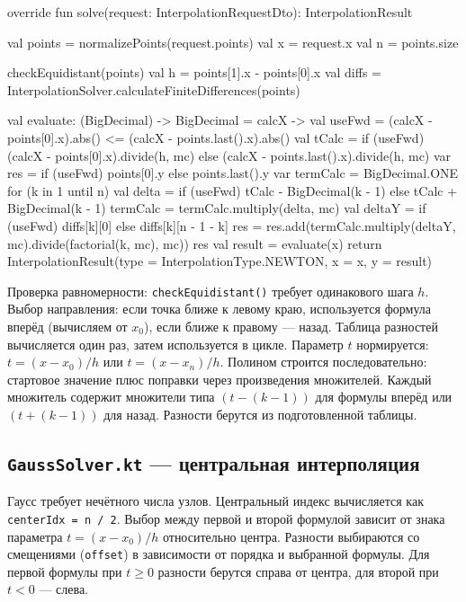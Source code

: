 \documentclass[12pt,a4paper]{article}
\begin{document}
\begin{codebox}
override fun solve(request: InterpolationRequestDto): InterpolationResult {
    val points = normalizePoints(request.points)
    val x = request.x
    val n = points.size

    checkEquidistant(points)
    val h = points[1].x - points[0].x
    val diffs = InterpolationSolver.calculateFiniteDifferences(points)

    val evaluate: (BigDecimal) -> BigDecimal = { calcX ->
        val useFwd = (calcX - points[0].x).abs() <= (calcX - points.last().x).abs()
        val tCalc = if (useFwd) (calcX - points[0].x).divide(h, mc) 
                    else (calcX - points.last().x).divide(h, mc)
        var res = if (useFwd) points[0].y else points.last().y
        var termCalc = BigDecimal.ONE
        for (k in 1 until n) {
            val delta = if (useFwd) tCalc - BigDecimal(k - 1) 
                       else tCalc + BigDecimal(k - 1)
            termCalc = termCalc.multiply(delta, mc)
            val deltaY = if (useFwd) diffs[k][0] else diffs[k][n - 1 - k]
            res = res.add(termCalc.multiply(deltaY, mc).divide(factorial(k, mc), mc))
        }
        res
    }
    val result = evaluate(x)
    return InterpolationResult(type = InterpolationType.NEWTON, x = x, y = result)
}
\end{codebox}

Проверка равномерности: \texttt{checkEquidistant()} требует одинакового шага $h$. Выбор направления: если точка ближе к левому краю, используется формула вперёд (вычисляем от $x_0$), если ближе к правому --- назад. Таблица разностей вычисляется один раз, затем используется в цикле. Параметр $t$ нормируется: $t = (x - x_0) / h$ или $t = (x - x_n) / h$. Полином строится последовательно: стартовое значение плюс поправки через произведения множителей. Каждый множитель содержит множители типа $(t - (k-1))$ для формулы вперёд или $(t + (k-1))$ для назад. Разности берутся из подготовленной таблицы.

\subsection{\texttt{GaussSolver.kt} --- центральная интерполяция}

Гаусс требует нечётного числа узлов. Центральный индекс вычисляется как \texttt{centerIdx = n / 2}. Выбор между первой и второй формулой зависит от знака параметра $t = (x - x_0) / h$ относительно центра. Разности выбираются со смещениями (\texttt{offset}) в зависимости от порядка и выбранной формулы. Для первой формулы при $t \geq 0$ разности берутся справа от центра, для второй при $t < 0$ --- слева.
\end{document}
